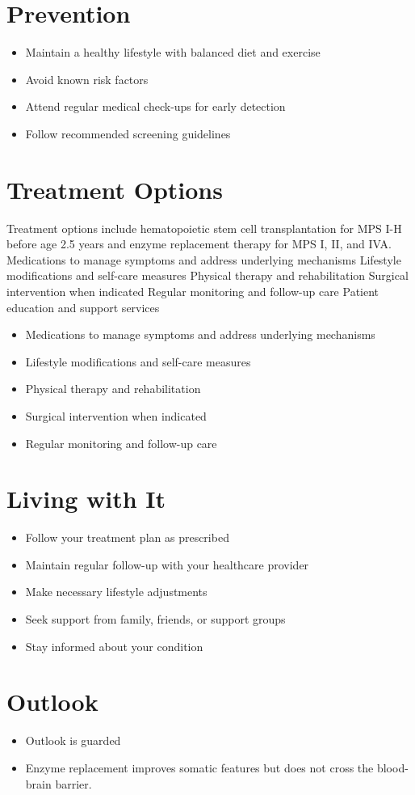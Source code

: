 \section{Prevention}
\begin{itemize}[noitemsep]
  \item Maintain a healthy lifestyle with balanced diet and exercise
  \item Avoid known risk factors
  \item Attend regular medical check-ups for early detection
  \item Follow recommended screening guidelines
\end{itemize}
\section{Treatment Options}
Treatment options include hematopoietic stem cell transplantation for MPS I-H before age 2.5 years and enzyme replacement therapy for MPS I, II, and IVA. Medications to manage symptoms and address underlying mechanisms Lifestyle modifications and self-care measures Physical therapy and rehabilitation Surgical intervention when indicated Regular monitoring and follow-up care Patient education and support services

\begin{itemize}[noitemsep]
  \item Medications to manage symptoms and address underlying mechanisms
  \item Lifestyle modifications and self-care measures
  \item Physical therapy and rehabilitation
  \item Surgical intervention when indicated
  \item Regular monitoring and follow-up care
\end{itemize}
\section{Living with It}
\begin{itemize}[noitemsep]
  \item Follow your treatment plan as prescribed
  \item Maintain regular follow-up with your healthcare provider
  \item Make necessary lifestyle adjustments
  \item Seek support from family, friends, or support groups
  \item Stay informed about your condition
\end{itemize}
\section{Outlook}
\begin{itemize}[noitemsep]
  \item Outlook is guarded
  \item Enzyme replacement improves somatic features but does not cross the blood-brain barrier.
\end{itemize}
